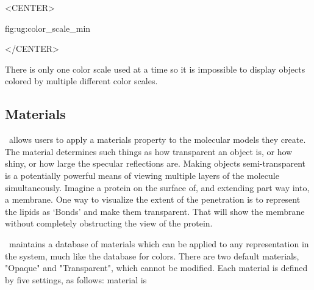 \begin{rawhtml}
<CENTER>
\end{rawhtml}
{fig:ug:color_scale_min}
\begin{rawhtml}
</CENTER>
\end{rawhtml}

There is only one color scale used at a time so it is impossible to
display objects colored by multiple different color scales.

\subsection{Materials}
\label{ug:topic:coloring:materials}

\VMD\ allows users to apply a materials property to the
molecular models they create.  The material determines such things
as how transparent an object is, or how shiny, or how large the specular 
reflections are.   
Making objects semi-transparent is a potentially powerful means of
viewing multiple layers of the molecule simultaneously.  Imagine a
protein on the surface of, and extending part way into, a membrane.
One way to visualize the extent of the penetration is to represent the
lipids as `Bonds' and make them transparent.  That will show the
membrane without completely obstructing the view of the protein.

\VMD\ maintains a database of materials which can be applied to any
representation in the system, much like the database for colors.  There
are two default materials, "Opaque" and "Transparent", which cannot be
modified.  Each material is defined by five settings, as follows: 
material is 

